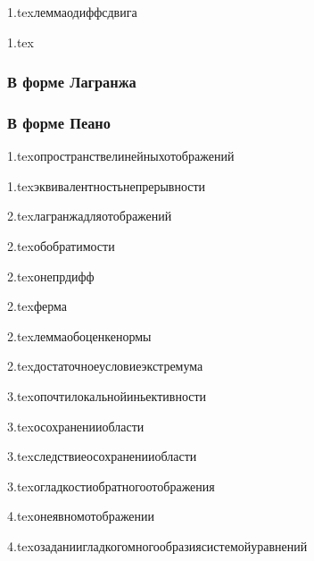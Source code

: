 {1.tex}{леммаодиффсдвига}

{1.tex}{}
\subsubsection{В форме Лагранжа}
\subsubsection{В форме Пеано}

{1.tex}{опространствелинейныхотображений}

{1.tex}{эквивалентностьнепрерывности}

{2.tex}{лагранжадляотображений}

{2.tex}{обобратимости}

{2.tex}{онепрдифф}

{2.tex}{ферма}

{2.tex}{леммаобоценкенормы}

{2.tex}{достаточноеусловиеэкстремума}

{3.tex}{опочтилокальнойиньективности}

{3.tex}{осохраненииобласти}

{3.tex}{следствиеосохраненииобласти}

{3.tex}{огладкостиобратногоотображения}

{4.tex}{онеявномотображении}

{4.tex}{озаданиигладкогомногообразиясистемойуравнений}

